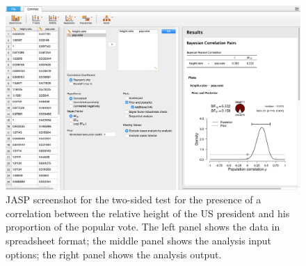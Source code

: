 \begin{figure}[tp]
    \begin{center}
        \includegraphics[width=1\textwidth]{figs/bi2_ScreenshotPresidents.eps}
        \caption{JASP screenshot for the two-sided test for the presence of a correlation between the relative height of the US president and his proportion of the popular vote. The left panel shows the data in spreadsheet format; the middle panel shows the analysis input options; the right panel shows the analysis output.} \label{fig:bi2:ScreenshotPresidents}
    \end{center}
\end{figure}
	

